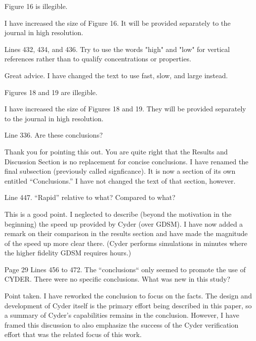 \documentclass[answers,12pt]{exam}
\begin{document}
\begin{questions}
\question Figure 16 is illegible.
\begin{solution}
I have increased the size of Figure 16.
        It will be provided separately to the journal in high resolution.  
\end{solution}

 

\question Lines 432, 434, and 436. Try to use the words "high" and "low" for 
vertical references rather than to qualify concentrations or properties.
\begin{solution}
Great advice. I have changed the text to use fast, slow, and large instead.
\end{solution}

 

\question Figures 18 and 19 are illegible.
\begin{solution}
I have increased the size of Figures 18 and 19.
        They will be provided separately to the journal in high resolution.  
\end{solution}

 

\question Line 336. Are these conclusions?
\begin{solution}
Thank you for pointing this out. You are quite right that the Results and 
        Discussion Section is no replacement for concise conclusions. I have 
        renamed the final subsection (previously called signficance). It is now 
        a section of its own entitled ``Conclusions.'' I have not changed the 
text of that section, however.  \end{solution}

 

\question Line 447. ``Rapid'' relative to what? Compared to what?
\begin{solution}
        This is a good point. I neglected to describe (beyond the motivation in 
        the beginning) the speed up provided by Cyder (over GDSM). I have now 
        added a remark on their comparison in the results section and have made 
        the magnitude of the speed up more clear there. (Cyder performs 
simulations in minutes where the higher fidelity GDSM requires hours.) 
\end{solution}

 

\question Page 29 Lines 456 to 472. The ``conclusions`` only seemed to promote 
the use of CYDER. There were no specific conclusions. What was new in this 
study?  \begin{solution}
Point taken. I have reworked the conclusion to focus on the facts. The design 
        and development of Cyder itself is the primary effort being described 
        in this paper, so a summary of Cyder's capabilities remains in the 
        conclusion. However, I have framed this discussion to also emphasize 
        the success of the Cyder verification effort that was the related focus 
        of this work.
\end{solution}



\end{questions}
\end{document}
